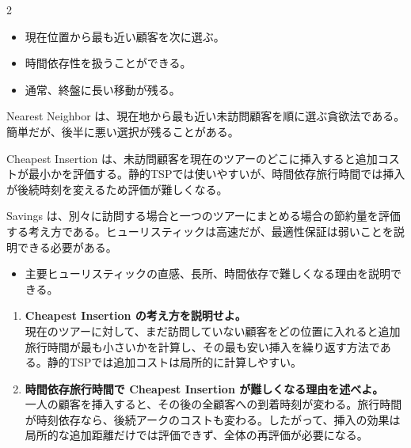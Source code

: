 \clearpage
{}
\begin{multicols}{2}\footnotesize\raggedcolumns
{}
\begin{itemize}
\item 現在位置から最も近い顧客を次に選ぶ。
\item 時間依存性を扱うことができる。
\item 通常、終盤に長い移動が残る。
\end{itemize}
Nearest Neighbor は、現在地から最も近い未訪問顧客を順に選ぶ貪欲法である。簡単だが、後半に悪い選択が残ることがある。\par

Cheapest Insertion は、未訪問顧客を現在のツアーのどこに挿入すると追加コストが最小かを評価する。静的TSPでは使いやすいが、時間依存旅行時間では挿入が後続時刻を変えるため評価が難しくなる。\par

Savings は、別々に訪問する場合と一つのツアーにまとめる場合の節約量を評価する考え方である。ヒューリスティックは高速だが、最適性保証は弱いことを説明できる必要がある。\par
{}
\begin{itemize}
\item 主要ヒューリスティックの直感、長所、時間依存で難しくなる理由を説明できる。
\end{itemize}
\begin{enumerate}
\item \textbf{Cheapest Insertion の考え方を説明せよ。}\\現在のツアーに対して、まだ訪問していない顧客をどの位置に入れると追加旅行時間が最も小さいかを計算し、その最も安い挿入を繰り返す方法である。静的TSPでは追加コストは局所的に計算しやすい。
\item \textbf{時間依存旅行時間で Cheapest Insertion が難しくなる理由を述べよ。}\\一人の顧客を挿入すると、その後の全顧客への到着時刻が変わる。旅行時間が時刻依存なら、後続アークのコストも変わる。したがって、挿入の効果は局所的な追加距離だけでは評価できず、全体の再評価が必要になる。
\end{enumerate}
\end{multicols}

